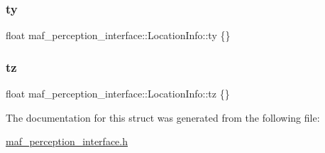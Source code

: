 \subsubsection{\texorpdfstring{ty}{ty}}
{\footnotesize\ttfamily float maf\+\_\+perception\+\_\+interface\+::\+Location\+Info\+::ty \{\}}

\mbox{\label{structmaf__perception__interface_1_1LocationInfo_ae5e011e94bead05c1f918548aca537d9}} 
\subsubsection{\texorpdfstring{tz}{tz}}
{\footnotesize\ttfamily float maf\+\_\+perception\+\_\+interface\+::\+Location\+Info\+::tz \{\}}



The documentation for this struct was generated from the following file\+:\begin{DoxyCompactItemize}
\item 
\hyperlink{maf__perception__interface_8h}{maf\+\_\+perception\+\_\+interface.\+h}\end{DoxyCompactItemize}
